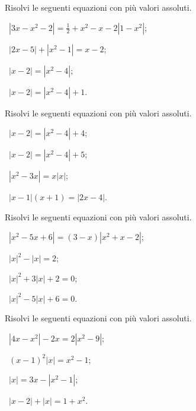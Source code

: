 \begin{esercizio}[\Ast]
 \label{ese:7.17}
Risolvi le seguenti equazioni con più valori assoluti.
\begin{multicols}{2}
 \begin{enumeratea}
 \item~$\left|3x-x^2-2\right|=\frac 1 2+x^2-x-2\left|1-x^2\right|$;
 \item~$\left|2x-5\right|+\left|x^2-1\right|=x-2$;
 \item~$\left|x-2\right|=\left|x^2-4\right|$;
 \item~$\left|x-2\right|=\left|x^2-4\right|+1$.
 \end{enumeratea}
 \end{multicols}
\end{esercizio}

\begin{esercizio}[\Ast]
 \label{ese:7.18}
Risolvi le seguenti equazioni con più valori assoluti.
\begin{multicols}{2}
 \begin{enumeratea}
 \item~$\left|x-2\right|=\left|x^2-4\right|+4$;
 \item~$\left|x-2\right|=\left|x^2-4\right|+5$;
 \item~$\left|x^2-3x\right|=x\left|x\right|$;
 \item~$\left|x-1\right|(x+1)=\left|2x-4\right|$.
 \end{enumeratea}
 \end{multicols}
\end{esercizio}

\begin{esercizio}[\Ast]
 \label{ese:7.19}
Risolvi le seguenti equazioni con più valori assoluti.
\begin{multicols}{2}
 \begin{enumeratea}
 \item~$\left|x^2-5x+6\right|=(3-x)\left|x^2+x-2\right|$;
 \item~$\left|x\right|^2-\left|x\right|=2$;
 \item~$\left|x\right|^2+3\left|x\right|+2=0$;
 \item~$\left|x\right|^2-5\left|x\right|+6=0$.
 \end{enumeratea}
 \end{multicols}
\end{esercizio}

\begin{esercizio}[\Ast]
 \label{ese:7.20}
Risolvi le seguenti equazioni con più valori assoluti.
\begin{multicols}{2}
 \begin{enumeratea}
 \item~$\left|4x-x^2\right|-2x=2\left|x^2-9\right|$;
 \item~$(x-1)^2\left|x\right|=x^2-1$;
 \item~$\left|x\right|=3x-\left|x^2-1\right|$;
 \item~$\left|x-2\right|+\left|x\right|=1+x^2$.
 \end{enumeratea}
 \end{multicols}
\end{esercizio}

